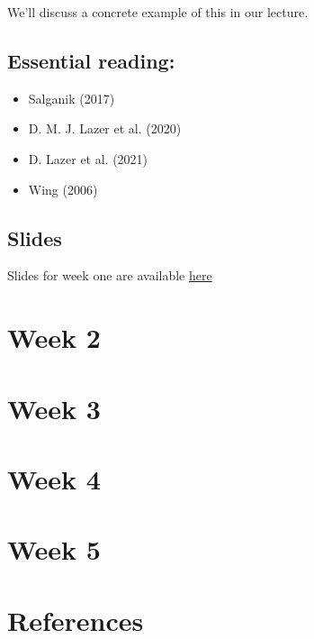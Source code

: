 \documentclass[
  letterpaper,
  DIV=11,
  numbers=noendperiod]{scrreprt}
\begin{document}
We'll discuss a concrete example of this in our lecture.

\hypertarget{essential-reading}{%
\section{Essential reading:}\label{essential-reading}}

\begin{itemize}
\item
  Salganik (2017)
\item
  D. M. J. Lazer et al. (2020)
\item
  D. Lazer et al. (2021)
\item
  Wing (2006)
\end{itemize}

\hypertarget{slides}{%
\section{Slides}\label{slides}}

Slides for week one are available
\href{https://raw.githack.com/cjbarrie/CS-ED/main/slides/000_intro.html}{here}


\hypertarget{week-2}{%
\chapter{Week 2}\label{week-2}}


\hypertarget{week-3}{%
\chapter{Week 3}\label{week-3}}


\hypertarget{week-4}{%
\chapter{Week 4}\label{week-4}}


\hypertarget{week-5}{%
\chapter{Week 5}\label{week-5}}


\hypertarget{references-3}{%
\chapter*{References}\label{references-3}}
\end{document}
